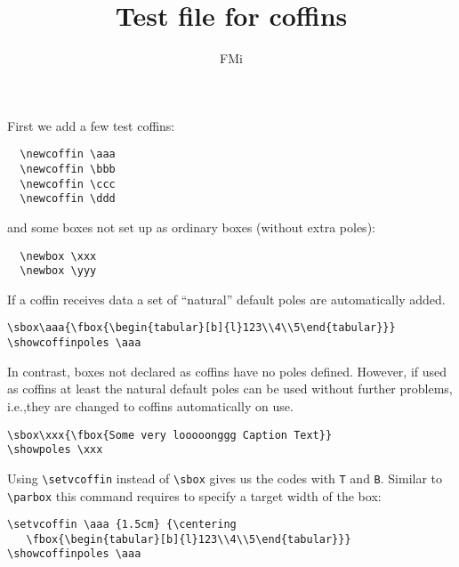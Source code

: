\documentclass{article}
\begin{document}
\title{Test file for coffins}
\author{FMi}
\maketitle

First we add a few test coffins:
\begin{verbatim}
  \newcoffin \aaa
  \newcoffin \bbb
  \newcoffin \ccc
  \newcoffin \ddd
\end{verbatim}
  \newcoffin \aaa
  \newcoffin \bbb
  \newcoffin \ccc
  \newcoffin \ddd
and some boxes not set up as ordinary boxes (without extra poles):
\begin{verbatim}
  \newbox \xxx
  \newbox \yyy
\end{verbatim}
  \newbox \xxx
  \newbox \yyy


If a coffin receives data a set of ``natural'' default poles are automatically added.
\begin{verbatim}
\sbox\aaa{\fbox{\begin{tabular}[b]{l}123\\4\\5\end{tabular}}}
\showcoffinpoles \aaa
\end{verbatim}
\sbox{}
\showcoffinpoles \aaa


In contrast, boxes not declared as coffins have no poles defined. However, if
used as coffins at least the natural default poles can be used without
further problems, i.e.,they are changed to coffins automatically on use.
\begin{verbatim}
\sbox\xxx{\fbox{Some very looooonggg Caption Text}}
\showpoles \xxx
\end{verbatim}
\sbox{}
\showcoffinpoles \xxx


Using \verb|\setvcoffin| instead of \verb|\sbox| gives us the codes with
\texttt{T} and \texttt{B}. Similar to \verb|\parbox| this command requires to
specify a target width of the box:
\begin{verbatim}
\setvcoffin \aaa {1.5cm} {\centering
   \fbox{\begin{tabular}[b]{l}123\\4\\5\end{tabular}}}
\showcoffinpoles \aaa
\end{verbatim}
\setvcoffin \aaa {1.5cm} {\centering
   }
\showcoffinpoles \aaa
\end{document}
